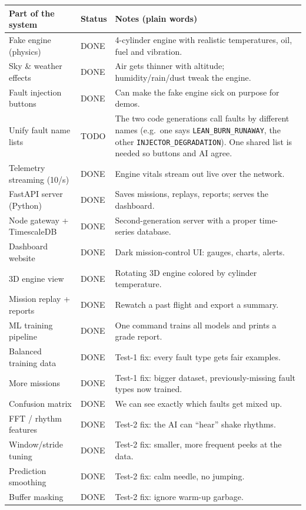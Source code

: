 \documentclass[11pt]{article}
\newcommand{\code}[1]{\texttt{#1}}
\begin{document}
\begin{longtable}{p{4.6cm} p{2.0cm} p{7.6cm}}
\toprule
\textbf{Part of the system} & \textbf{Status} & \textbf{Notes (plain words)} \\
\midrule
\endhead
Fake engine (physics) & DONE & 4-cylinder engine with realistic temperatures, oil, fuel and vibration. \\
Sky \& weather effects & DONE & Air gets thinner with altitude; humidity/rain/dust tweak the engine. \\
Fault injection buttons & DONE & Can make the fake engine sick on purpose for demos. \\
\quad Unify fault name lists & TODO & The two code generations call faults by different names (e.g.\ one says \code{LEAN\_BURN\_RUNAWAY}, the other \code{INJECTOR\_DEGRADATION}). One shared list is needed so buttons and AI agree. \\
Telemetry streaming (10/s) & DONE & Engine vitals stream out live over the network. \\
FastAPI server (Python) & DONE & Saves missions, replays, reports; serves the dashboard. \\
Node gateway + TimescaleDB & DONE & Second-generation server with a proper time-series database. \\
Dashboard website & DONE & Dark mission-control UI: gauges, charts, alerts. \\
3D engine view & DONE & Rotating 3D engine colored by cylinder temperature. \\
Mission replay + reports & DONE & Rewatch a past flight and export a summary. \\
ML training pipeline & DONE & One command trains all models and prints a grade report. \\
Balanced training data & DONE & Test-1 fix: every fault type gets fair examples. \\
More missions & DONE & Test-1 fix: bigger dataset, previously-missing fault types now trained. \\
Confusion matrix & DONE & We can see exactly which faults get mixed up. \\
FFT / rhythm features & DONE & Test-2 fix: the AI can ``hear'' shake rhythms. \\
Window/stride tuning & DONE & Test-2 fix: smaller, more frequent peeks at the data. \\
Prediction smoothing & DONE & Test-2 fix: calm needle, no jumping. \\
Buffer masking & DONE & Test-2 fix: ignore warm-up garbage. \\

\end{longtable}
\end{document}

